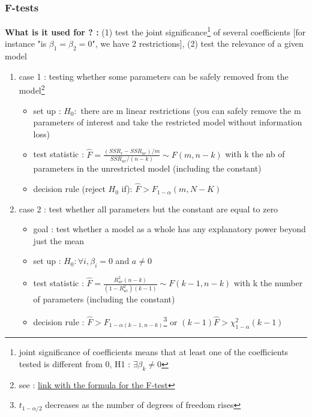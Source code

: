 \documentclass{article}
\begin{document}
\subsubsection{F-tests}
\begin{Fisherbox}
\textbf{What is it used for ? :} (1) test the joint significance\footnote{joint significance of coefficients means that at least one of the coefficients tested is different from 0, H1 : $\exists\beta_k\neq0$} of several coefficients [for instance "is $\beta_1=\beta_2=0$", we have 2 restrictions], (2)  test the relevance of a given model 
\begin{enumerate}
    \item case 1 : testing whether some parameters can be safely removed from the model\footnote{see :  \href{https://www.statisticshowto.com/probability-and-statistics/hypothesis-testing/f-test/}{link with the formula for the F-test} }
    \begin{itemize}
        \item set up : $H_0 :$ there are m linear restrictions (you can safely remove the m parameters of interest and take the restricted model without information loss)
        \item test statistic : $\hat{F}= \frac{(SSR_{r}-SSR_{ur})/m}{SSR_{ur}/(n-k)}\sim F(m,n-k) $ with k the nb of parameters in the unrestricted model (including the constant)
        \item decision rule (reject $H_0$ if): $\hat{F}>F_{1-\alpha}(m, N-K)$
    \end{itemize}
    \item case 2 : test whether all parameters but the constant are equal to zero 
    \begin{itemize}
        \item goal : test whether a model as a whole has any explanatory power beyond just the mean 
        \item set up : $H_0 : \forall i, \beta_i=0$ and $a\neq0$ 
        \item test statistic : $\hat{F}=\frac{R^2_{ur}(n-k)}{(1-R^2_{ur})(k-1)}\sim F(k-1,n-k)$ with k the number of parameters (including the constant)
        \item decision rule : $\hat{F}>F_{1-\alpha(k-1,n-k)}$\footnote{$t_{1-\alpha/2}$ decreases as the number of degrees of freedom rises} or $(k-1)\hat{F} >\chi^2_{1-\alpha}(k-1)$
    \end{itemize}
\end{enumerate}
\end{Fisherbox}
\end{document}
